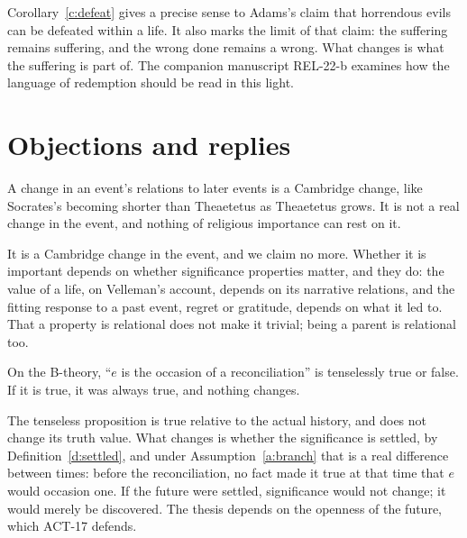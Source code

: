 \documentclass{situationist-preprint}
\begin{document}
Corollary~\ref{c:defeat} gives a precise sense to Adams's claim that horrendous evils can be defeated within a life. It also marks the limit of that claim: the suffering remains suffering, and the wrong done remains a wrong. What changes is what the suffering is part of. The companion manuscript REL-22-b examines how the language of redemption should be read in this light.

\section{Objections and replies}

\begin{objection}
A change in an event's relations to later events is a Cambridge change, like Socrates's becoming shorter than Theaetetus as Theaetetus grows. It is not a real change in the event, and nothing of religious importance can rest on it.
\end{objection}

\begin{reply}
It is a Cambridge change in the event, and we claim no more. Whether it is important depends on whether significance properties matter, and they do: the value of a life, on Velleman's account, depends on its narrative relations, and the fitting response to a past event, regret or gratitude, depends on what it led to. That a property is relational does not make it trivial; being a parent is relational too.
\end{reply}

\begin{objection}
On the B-theory, \enquote{$e$ is the occasion of a reconciliation} is tenselessly true or false. If it is true, it was always true, and nothing changes.
\end{objection}

\begin{reply}
The tenseless proposition is true relative to the actual history, and does not change its truth value. What changes is whether the significance is settled, by Definition~\ref{d:settled}, and under Assumption~\ref{a:branch} that is a real difference between times: before the reconciliation, no fact made it true at that time that $e$ would occasion one. If the future were settled, significance would not change; it would merely be discovered. The thesis depends on the openness of the future, which ACT-17 defends.
\end{reply}
\end{document}
